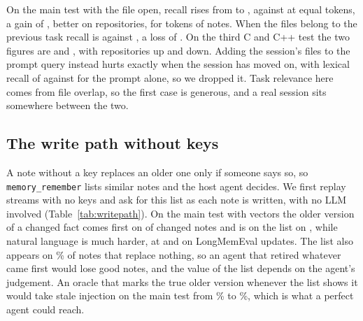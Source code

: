 On the main test with the file open, recall rises from  to , against  at equal tokens, a gain of , better on  repositories, for  tokens of notes. When the files belong to the previous task recall is  against , a loss of . On the third C and C++ test the two figures are  and , with  repositories up and  down. Adding the session's files to the prompt query instead hurts exactly when the session has moved on, with lexical recall of  against  for the prompt alone, so we dropped it. Task relevance here comes from file overlap, so the first case is generous, and a real session sits somewhere between the two.

\begin{table}[!htb]\centering\scriptsize
\caption{File notes with vectors. Recall on the task track from the prompt alone, from the prompt with the same tokens added, and from the prompt plus file notes. Precision is that of the notes, and the last columns count repositories where notes beat equal tokens or lose to them.}\label{tab:files}
\resizebox{\columnwidth}{!}{}
\end{table}

\subsection{The write path without keys}\label{sec:writepath}
A note without a key replaces an older one only if someone says so, so \texttt{memory\_remember} lists similar notes and the host agent decides. We first replay streams with no keys and ask for this list as each note is written, with no LLM involved (Table~\ref{tab:writepath}). On the main test with vectors the older version of a changed fact comes first on  of changed notes and is on the list on , while natural language is much harder, at  and  on LongMemEval updates. The list also appears on \% of notes that replace nothing, so an agent that retired whatever came first would lose good notes, and the value of the list depends on the agent's judgement. An oracle that marks the true older version whenever the list shows it would take stale injection on the main test from \% to \%, which is what a perfect agent could reach.


